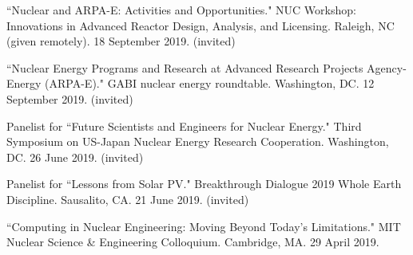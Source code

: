 \begin{bibsection}

\item ``Nuclear and ARPA-E: Activities and Opportunities." NUC
Workshop: Innovations in Advanced Reactor Design, Analysis, and Licensing.
Raleigh, NC (given remotely). 18 September 2019. (invited)

\item ``Nuclear Energy Programs and Research at Advanced
Research Projects Agency-Energy (ARPA-E)." GABI nuclear energy roundtable.
Washington, DC. 12 September 2019. (invited)



\item Panelist for ``Future Scientists and Engineers for Nuclear Energy." Third Symposium on US-Japan Nuclear Energy Research Cooperation. Washington, DC. 26 June 2019. (invited)

\item Panelist for ``Lessons from Solar PV." Breakthrough Dialogue 2019 Whole Earth Discipline. Sausalito, CA. 21 June 2019. (invited)




\item ``Computing in Nuclear Engineering: Moving Beyond Today's Limitations." MIT Nuclear Science \& Engineering Colloquium. Cambridge, MA. 29 April 2019.



\end{bibsection}

